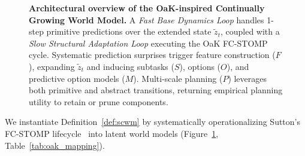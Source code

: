 \documentclass{article}
\theoremstyle{definition}
\begin{document}
\begin{figure}[t]
{%
}
\vspace{-0.25cm}
\caption{\textbf{Architectural overview of the OaK-inspired Continually Growing World Model.} A \emph{Fast Base Dynamics Loop} handles 1-step primitive predictions over the extended state $\tilde{z}_t$, coupled with a \emph{Slow Structural Adaptation Loop} executing the OaK FC-STOMP cycle. Systematic prediction surprises trigger feature construction ($F$), expanding $\tilde{z}_t$ and inducing subtasks ($S$), options ($O$), and predictive option models ($M$). Multi-scale planning ($P$) leverages both primitive and abstract transitions, returning empirical planning utility to retain or prune components.}
\label{fig:oak_wm_arch}
\vspace{-0.25cm}
\end{figure}

We instantiate Definition~\ref{def:scwm} by systematically operationalizing Sutton's FC-STOMP lifecycle~\citep{sutton2025oak} into latent world models (Figure~\ref{fig:oak_wm_arch}, Table~\ref{tab:oak_mapping}).
\end{document}
